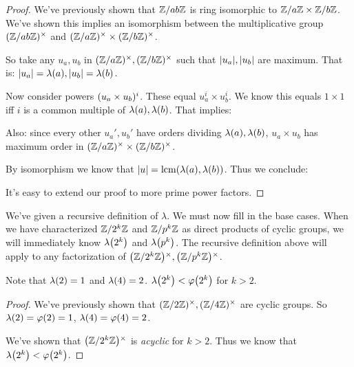 \begin{proof}
  We've previously shown that $\Zmod{ab}$ is ring isomorphic to
  $\Zmod{a} \times \Zmod{b}$. We've shown this implies an isomorphism
  between the multiplicative group $\Zmodx{ab}$ and $\Zmodax \times
  \Zmodbx$.

  So take any $u_a, u_b$ in $\Zmodax, \Zmodbx$ such that $\order{u_a},
  \order{u_b}$ are maximum. That is: $\order{u_a} = \lambdaf{a},
  \order{u_b} = \lambdaf{b}$.

  Now consider powers $\parens{u_a \times u_b}^i$. These equal $u_a^i
  \times u_b^i$. We know this equals $1 \times 1$ iff $i$ is a common
  multiple of $\lambdaf{a}, \lambdaf{b}$. That implies:

  \begin{nedqn}
  \eqcol
  \end{nedqn}

  Also: since every other $u_a', u_b'$ have orders dividing
  $\lambdaf{a}, \lambdaf{b}$, $u_a \times u_b$ has maximum order in
  $\Zmodax \times \Zmodbx$.

  By isomorphism we know that $\order{u} = \lcmf{\lambdaf{a},
  \lambdaf{b}}$. Thus we conclude:

  \begin{nedqn}
  \eqcol
  \end{nedqn}

  It's easy to extend our proof to more prime power factors.
\end{proof}

\begin{remark}
  We've given a recursive definition of $\lambda$. We must now fill in
  the base cases. When we have characterized $\Zmod{2^k}$ and
  $\Zmod{p^k}$ as direct products of cyclic groups, we will immediately
  know $\lambdaf{2^k}$ and $\lambdaf{p^k}$. The recursive definition
  above will apply to any factorization of $\Zmodx{2^k}, \Zmodx{p^k}$.
\end{remark}

\begin{proposition}
  Note that $\lambdaf{2} = 1$ and $\lambdaf{4} = 2$. $\lambdaf{2^k} <
  \vphif{2^k}$ for $k > 2$.
\end{proposition}

\begin{proof}
  We've previously shown that $\Zmodx{2}, \Zmodx{4}$ are cyclic groups.
  So $\lambdaf{2} = \vphif{2} = 1$, $\lambdaf{4} = \vphif{4} = 2$.

  We've shown that $\Zmodx{2^k}$ is \emph{acyclic} for $k > 2$. Thus we
  know that $\lambdaf{2^k} < \vphif{2^k}$.
\end{proof}
